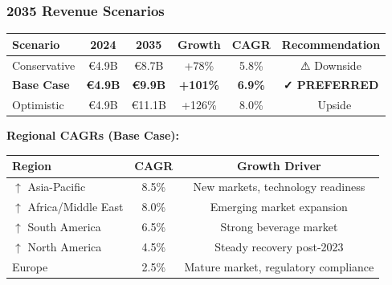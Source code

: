 \documentclass[aspectratio=169,12pt,xcolor=dvipsnames]{beamer}
\newcommand{\highlight}[1]{{\color{alpla_blue}\textbf{#1}}}
\newcommand{\increase}[1]{{\color{alpla_green}$\uparrow$ #1}}
\begin{document}
\begin{frame}
  \frametitle{2035 Revenue Scenarios}

  \begin{center}
    \small
    \begin{tabular}{lccccc}
      \toprule
      \textbf{Scenario} & \textbf{2024} & \textbf{2035} & \textbf{Growth} & \textbf{CAGR} & \textbf{Recommendation} \\
      \midrule
      Conservative & €4.9B & €8.7B & +78\% & 5.8\% & ⚠ Downside \\
      \textbf{Base Case} & \textbf{€4.9B} & \textbf{€9.9B} & \textbf{+101\%} & \textbf{6.9\%} & \textbf{\highlight{✓ PREFERRED}} \\
      Optimistic & €4.9B & €11.1B & +126\% & 8.0\% & 🚀 Upside \\
      \bottomrule
    \end{tabular}
  \end{center}

  \vspace{0.8cm}

  \textbf{Regional CAGRs (Base Case):}

  \begin{center}
    \begin{tabular}{lcc}
      \toprule
      \textbf{Region} & \textbf{CAGR} & \textbf{Growth Driver} \\
      \midrule
      \increase{Asia-Pacific} & 8.5\% & New markets, technology readiness \\
      \increase{Africa/Middle East} & 8.0\% & Emerging market expansion \\
      \increase{South America} & 6.5\% & Strong beverage market \\
      \increase{North America} & 4.5\% & Steady recovery post-2023 \\
      Europe & 2.5\% & Mature market, regulatory compliance \\
      \bottomrule
    \end{tabular}
  \end{center}

\end{frame}

\end{document}
